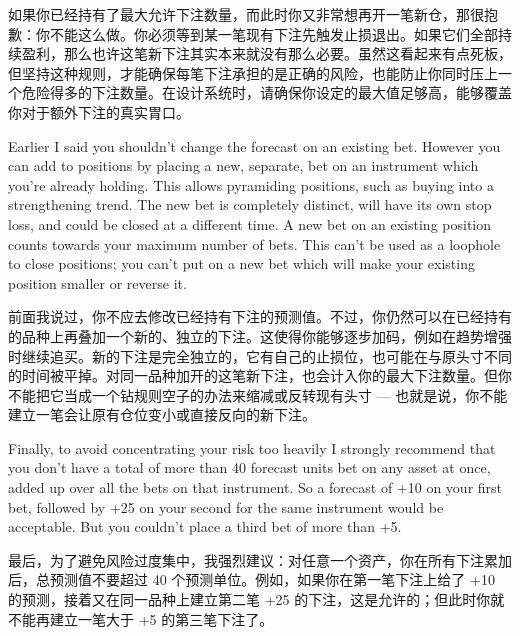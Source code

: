 \begin{chineseblock}如果你已经持有了最大允许下注数量，而此时你又非常想再开一笔新仓，那很抱歉：你不能这么做。你必须等到某一笔现有下注先触发止损退出。如果它们全部持续盈利，那么也许这笔新下注其实本来就没有那么必要。虽然这看起来有点死板，但坚持这种规则，才能确保每笔下注承担的是正确的风险，也能防止你同时压上一个危险得多的下注数量。在设计系统时，请确保你设定的最大值足够高，能够覆盖你对于额外下注的真实胃口。\end{chineseblock}

\bipairgap

\begin{englishblock} Earlier I said you shouldn't change the forecast on an existing bet. However you can add to positions by placing a new, separate, bet on an instrument which you're already holding. This allows pyramiding positions, such as buying into a strengthening trend. The new bet is completely distinct, will have its own stop loss, and could be closed at a different time. A new bet on an existing position counts towards your maximum number of bets. This can't be used as a loophole to close positions; you can't put on a new bet which will make your existing position smaller or reverse it. \end{englishblock}

\begin{chineseblock}前面我说过，你不应去修改已经持有下注的预测值。不过，你仍然可以在已经持有的品种上再叠加一个新的、独立的下注。这使得你能够逐步加码，例如在趋势增强时继续追买。新的下注是完全独立的，它有自己的止损位，也可能在与原头寸不同的时间被平掉。对同一品种加开的这笔新下注，也会计入你的最大下注数量。但你不能把它当成一个钻规则空子的办法来缩减或反转现有头寸 --- 也就是说，你不能建立一笔会让原有仓位变小或直接反向的新下注。\end{chineseblock}

\bipairgap

\begin{englishblock} Finally, to avoid concentrating your risk too heavily I strongly recommend that you don't have a total of more than 40 forecast units bet on any asset at once, added up over all the bets on that instrument. So a forecast of +10 on your first bet, followed by +25 on your second for the same instrument would be acceptable. But you couldn't place a third bet of more than +5. \end{englishblock}

\begin{chineseblock}最后，为了避免风险过度集中，我强烈建议：对任意一个资产，你在所有下注累加后，总预测值不要超过 40 个预测单位。例如，如果你在第一笔下注上给了 +10 的预测，接着又在同一品种上建立第二笔 +25 的下注，这是允许的；但此时你就不能再建立一笔大于 +5 的第三笔下注了。\end{chineseblock}

